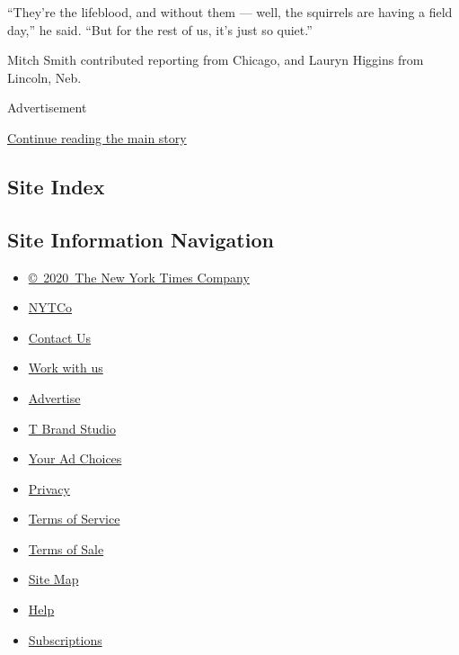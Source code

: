 ``They're the lifeblood, and without them --- well, the squirrels are
having a field day,'' he said. ``But for the rest of us, it's just so
quiet.''

Mitch Smith contributed reporting from Chicago, and Lauryn Higgins from
Lincoln, Neb.

Advertisement

\protect\hyperlink{after-bottom}{Continue reading the main story}

\hypertarget{site-index}{%
\subsection{Site Index}\label{site-index}}

\hypertarget{site-information-navigation}{%
\subsection{Site Information
Navigation}\label{site-information-navigation}}

\begin{itemize}
\tightlist
\item
  \href{https://help.nytimes3xbfgragh.onion/hc/en-us/articles/115014792127-Copyright-notice}{©~2020~The
  New York Times Company}
\end{itemize}

\begin{itemize}
\tightlist
\item
  \href{https://www.nytco.com/}{NYTCo}
\item
  \href{https://help.nytimes3xbfgragh.onion/hc/en-us/articles/115015385887-Contact-Us}{Contact
  Us}
\item
  \href{https://www.nytco.com/careers/}{Work with us}
\item
  \href{https://nytmediakit.com/}{Advertise}
\item
  \href{http://www.tbrandstudio.com/}{T Brand Studio}
\item
  \href{https://www.nytimes3xbfgragh.onion/privacy/cookie-policy\#how-do-i-manage-trackers}{Your
  Ad Choices}
\item
  \href{https://www.nytimes3xbfgragh.onion/privacy}{Privacy}
\item
  \href{https://help.nytimes3xbfgragh.onion/hc/en-us/articles/115014893428-Terms-of-service}{Terms
  of Service}
\item
  \href{https://help.nytimes3xbfgragh.onion/hc/en-us/articles/115014893968-Terms-of-sale}{Terms
  of Sale}
\item
  \href{https://spiderbites.nytimes3xbfgragh.onion}{Site Map}
\item
  \href{https://help.nytimes3xbfgragh.onion/hc/en-us}{Help}
\item
  \href{https://www.nytimes3xbfgragh.onion/subscription?campaignId=37WXW}{Subscriptions}
\end{itemize}
